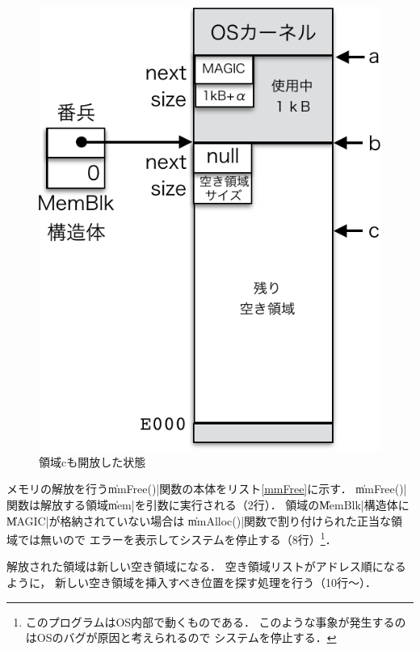 \begin{figure}[btp]
\begin{center}
\begin{minipage}{0.49\columnwidth}
      \includegraphics[scale=0.66]{Fig/mmFree2-crop.pdf}
      \caption{領域cも開放した状態}\label{fig:mmFree2}
    \end{minipage}
  \end{center}
\end{figure}

メモリの解放を行う\|mmFree()|関数の本体をリスト\ref{mmFree}に示す．
\|mmFree()|関数は解放する領域\|mem|を引数に実行される（2行）．
領域の\|MemBlk|構造体に\|MAGIC|が格納されていない場合は
\|mmAlloc()|関数で割り付けられた正当な領域では無いので
エラーを表示してシステムを停止する（8行）\footnote{
  このプログラムはOS内部で動くものである．
  このような事象が発生するのはOSのバグが原因と考えられるので
  システムを停止する．}．



解放された領域は新しい空き領域になる．
空き領域リストがアドレス順になるように，
新しい空き領域を挿入すべき位置を探す処理を行う（10行〜）．


